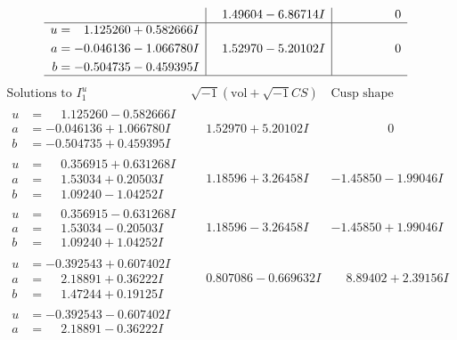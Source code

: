 \documentclass[1p]{elsarticle_modified}
\theoremstyle{definition}
\newcommand{\I}{\sqrt{-1}}
\begin{document}
$$\begin{array}{c|c|c}
 & \phantom{-}1.49604 - 6.86714 I & \phantom{-0.000000 } 0 \\ \hline\begin{aligned}
u &= \phantom{-}1.125260 + 0.582666 I \\
a &= -0.046136 - 1.066780 I \\
b &= -0.504735 - 0.459395 I\end{aligned}
 & \phantom{-}1.52970 - 5.20102 I & \phantom{-0.000000 } 0\\
 \hline 
 \end{array}$$\newpage$$\begin{array}{c|c|c}  
\text{Solutions to }I^u_{1}& \I (\text{vol} + \sqrt{-1}CS) & \text{Cusp shape}\\
 \hline 
\begin{aligned}
u &= \phantom{-}1.125260 - 0.582666 I \\
a &= -0.046136 + 1.066780 I \\
b &= -0.504735 + 0.459395 I\end{aligned}
 & \phantom{-}1.52970 + 5.20102 I & \phantom{-0.000000 } 0 \\ \hline\begin{aligned}
u &= \phantom{-}0.356915 + 0.631268 I \\
a &= \phantom{-}1.53034 + 0.20503 I \\
b &= \phantom{-}1.09240 - 1.04252 I\end{aligned}
 & \phantom{-}1.18596 + 3.26458 I & -1.45850 - 1.99046 I \\ \hline\begin{aligned}
u &= \phantom{-}0.356915 - 0.631268 I \\
a &= \phantom{-}1.53034 - 0.20503 I \\
b &= \phantom{-}1.09240 + 1.04252 I\end{aligned}
 & \phantom{-}1.18596 - 3.26458 I & -1.45850 + 1.99046 I \\ \hline\begin{aligned}
u &= -0.392543 + 0.607402 I \\
a &= \phantom{-}2.18891 + 0.36222 I \\
b &= \phantom{-}1.47244 + 0.19125 I\end{aligned}
 & \phantom{-}0.807086 - 0.669632 I & \phantom{-}8.89402 + 2.39156 I \\ \hline\begin{aligned}
u &= -0.392543 - 0.607402 I \\
a &= \phantom{-}2.18891 - 0.36222 I \\

\end{aligned}
\end{array}$$
\end{document}
